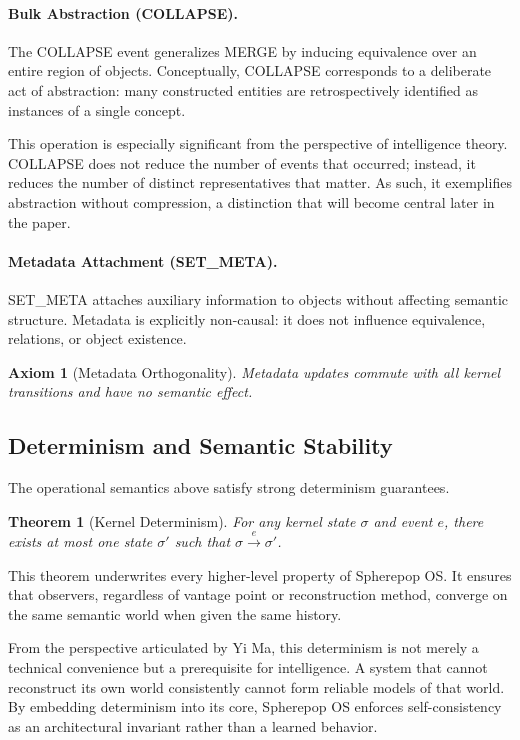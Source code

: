 \documentclass[11pt]{article}
\newtheorem{axiom}{Axiom}[section]
\newtheorem{theorem}{Theorem}[section]
\begin{document}
\paragraph{Bulk Abstraction (COLLAPSE).}
The COLLAPSE event generalizes MERGE by inducing equivalence over an entire
region of objects. Conceptually, COLLAPSE corresponds to a deliberate act of
abstraction: many constructed entities are retrospectively identified as
instances of a single concept.

This operation is especially significant from the perspective of
intelligence theory. COLLAPSE does not reduce the number of events that
occurred; instead, it reduces the number of distinct representatives that
matter. As such, it exemplifies abstraction without compression, a
distinction that will become central later in the paper.

\paragraph{Metadata Attachment (SET\_META).}
SET\_META attaches auxiliary information to objects without affecting
semantic structure. Metadata is explicitly non-causal: it does not influence
equivalence, relations, or object existence.

\begin{axiom}[Metadata Orthogonality]
Metadata updates commute with all kernel transitions and have no semantic
effect.
\end{axiom}

\subsection{Determinism and Semantic Stability}

The operational semantics above satisfy strong determinism guarantees.

\begin{theorem}[Kernel Determinism]
For any kernel state $\sigma$ and event $e$, there exists at most one state
$\sigma'$ such that $\sigma \xrightarrow{e} \sigma'$.
\end{theorem}

This theorem underwrites every higher-level property of Spherepop OS. It
ensures that observers, regardless of vantage point or reconstruction
method, converge on the same semantic world when given the same history.

From the perspective articulated by Yi Ma, this determinism is not merely a
technical convenience but a prerequisite for intelligence. A system that
cannot reconstruct its own world consistently cannot form reliable models
of that world. By embedding determinism into its core, Spherepop OS enforces
self-consistency as an architectural invariant rather than a learned
behavior.
\end{document}
